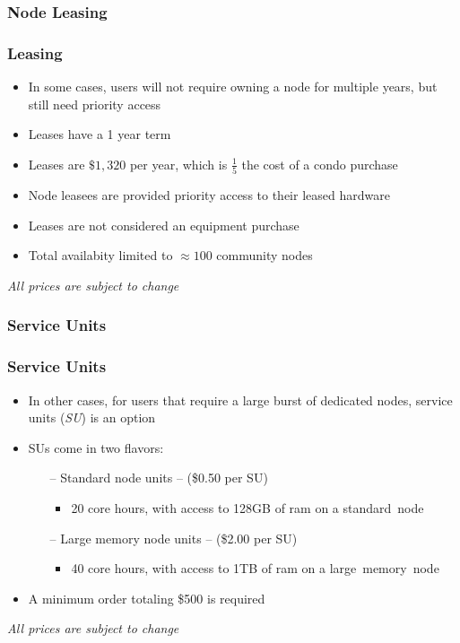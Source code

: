 \subsubsection{Node Leasing}
\begin{frame}
	\frametitle{Leasing}
	\begin{itemize}
        \item In some cases, users will not require owning a node for multiple years, but still need priority access
	\item Leases have a 1 year term
        \item Leases are $\$1,320$ per year, which is \( \frac{1}{5} \) the cost of a condo purchase
        \item Node leasees are provided priority access to their leased hardware
        \item Leases are not considered an equipment purchase
        \item Total availabity limited to $\approx100$ community nodes
	\end{itemize}
        \btVFill
        \begin{center}{\footnotesize \emph{All prices are subject to change}}\end{center}
\end{frame}


\subsubsection{Service Units}
\begin{frame}	
	\frametitle{Service Units}
	\begin{itemize}
	 \item In other cases, for users that require a large burst of dedicated nodes, service units (\emph{SU}) is an option
	 \item SUs come in two flavors:
		 \begin{itemize}
			 \item[--] Standard node units -- (\$0.50 per SU) 
				\begin{itemize}
					\item 20 core hours, with access to 128GB of ram on a standard~node
				\end{itemize}
			 \item[--] Large memory node units -- (\$2.00 per SU)
				\begin{itemize}
					\item 40 core hours, with access to 1TB of ram on a large~memory~node
				\end{itemize}
		 \end{itemize}
	 \item A minimum order totaling \$500 is required
	\end{itemize}
        \btVFill
	\begin{center}{\footnotesize \emph{All prices are subject to change}}\end{center}
\end{frame}


